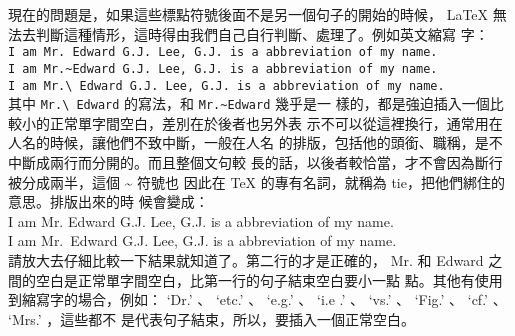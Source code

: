 \documentclass[12pt, a4paper]{report}
\begin{document}
\begin{enumerate}
          現在的問題是，如果這些標點符號後面不是另一個句子的開始的時候， LaTeX 
            無法去判斷這種情形，這時得由我們自己自行判斷、處理了。例如英文縮寫
            字：\\
            \verb+I am Mr. Edward G.J. Lee, G.J. is a abbreviation of my name.+\\
            \verb+I am Mr.~Edward G.J. Lee, G.J. is a abbreviation of my name.+\\
            \verb+I am Mr.\ Edward G.J. Lee, G.J. is a abbreviation of my name.+\\
          其中 \verb+Mr.\ Edward+ 的寫法，和 \verb+Mr.~Edward+ 幾乎是一
            樣的，都是強迫插入一個比較小的正常單字間空白，差別在於後者也另外表
            示不可以從這裡換行，通常用在人名的時候，讓他們不致中斷，一般在人名
            的排版，包括他的頭銜、職稱，是不中斷成兩行而分開的。而且整個文句較
            長的話，以後者較恰當，才不會因為斷行被分成兩半，這個 \~{} 符號也
            因此在 TeX 的專有名詞，就稱為 tie，把他們綁住的意思。排版出來的時
            候會變成： \\
            I am Mr. Edward G.J. Lee, G.J. is a abbreviation of my 
              name. \\
            I am Mr.\ Edward G.J. Lee, G.J. is a abbreviation of my 
              name.\\
          請放大去仔細比較一下結果就知道了。第二行的才是正確的， Mr. 和 
            Edward 之間的空白是正常單字間空白，比第一行的句子結束空白要小一點
            點。其他有使用到縮寫字的場合，例如： `Dr.' 、 `etc.' 、 `e.g.' 
            、 `i.e .' 、 `vs.' 、 `Fig.' 、 `cf.' 、 `Mrs.' ，這些都不
            是代表句子結束，所以，要插入一個正常空白。


\end{enumerate}
\end{document}
